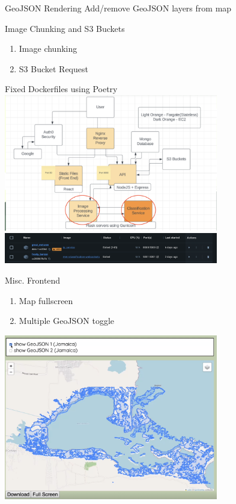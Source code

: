 \begin{frame}{GeoJSON Rendering}
    Add/remove GeoJSON layers from map
\end{frame}

\begin{frame}{Image Chunking and S3 Buckets}
    \begin{enumerate}
        \item Image chunking
        \item S3 Bucket Request
    \end{enumerate}
\end{frame}

\begin{frame}{Fixed Dockerfiles using Poetry}
    \includegraphics[height=0.7\textheight,width=0.7\textwidth,keepaspectratio]{mm-images/Screenshot 2024-01-24 at 1.33.57 PM.png}
    \includegraphics[height=0.7\textheight,width=0.7\textwidth,keepaspectratio]{mm-images/Screenshot 2024-01-24 at 1.35.48 PM.png}
\end{frame}

\begin{frame}{Misc. Frontend}
    \begin{enumerate}
        \item Map fullscreen
        \item Multiple GeoJSON toggle
    \end{enumerate}
    \includegraphics[height=0.7\textheight,width=0.7\textwidth,keepaspectratio]{mm_1-24_fullscreen.png}
\end{frame}

